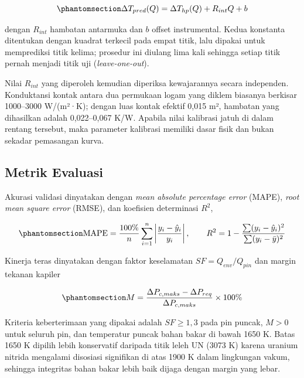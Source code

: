 \documentclass[
  indonesian,
  12pt,
  a4paper,
]{report}
\begin{document}
\begin{equation}\protect\phantomsection\label{eq-kalibrasi}{\Delta T_{pred}(Q) = \Delta T_{hp}(Q) + R_{int} Q + b}\end{equation}

dengan \(R_{int}\) hambatan antarmuka dan \(b\) offset instrumental.
Kedua konstanta ditentukan dengan kuadrat terkecil pada empat titik,
lalu dipakai untuk memprediksi titik kelima; prosedur ini diulang lima
kali sehingga setiap titik pernah menjadi titik uji
(\emph{leave-one-out}).

Nilai \(R_{int}\) yang diperoleh kemudian diperiksa kewajarannya secara
independen. Konduktansi kontak antara dua permukaan logam yang diklem
biasanya berkisar 1000--3000 W/(m²·K); dengan luas kontak efektif 0,015
m², hambatan yang dihasilkan adalah 0,022--0,067 K/W. Apabila nilai
kalibrasi jatuh di dalam rentang tersebut, maka parameter kalibrasi
memiliki dasar fisik dan bukan sekadar pemasangan kurva.

\subsection{Metrik Evaluasi}\label{metrik-evaluasi}

Akurasi validasi dinyatakan dengan \emph{mean absolute percentage error}
(MAPE), \emph{root mean square error} (RMSE), dan koefisien determinasi
\(R^{2}\),

\begin{equation}\protect\phantomsection\label{eq-metrik}{\mathrm{MAPE} = \frac{100\%}{n}\sum_{i=1}^{n}\left|\frac{y_i - \hat y_i}{y_i}\right|, \qquad
R^{2} = 1 - \frac{\sum (y_i - \hat y_i)^{2}}{\sum (y_i - \bar y)^{2}}}\end{equation}

Kinerja teras dinyatakan dengan faktor keselamatan
\(SF = Q_{env}/Q_{pin}\) dan margin tekanan kapiler

\begin{equation}\protect\phantomsection\label{eq-margin}{M = \frac{\Delta P_{c,maks} - \Delta P_{req}}{\Delta P_{c,maks}} \times 100\%}\end{equation}

Kriteria keberterimaan yang dipakai adalah \(SF \ge 1{,}3\) pada pin
puncak, \(M > 0\) untuk seluruh pin, dan temperatur puncak bahan bakar
di bawah 1650 K. Batas 1650 K dipilih lebih konservatif daripada titik
leleh UN (3073 K) karena uranium nitrida mengalami disosiasi signifikan
di atas 1900 K dalam lingkungan vakum, sehingga integritas bahan bakar
lebih baik dijaga dengan margin yang lebar.
\end{document}
